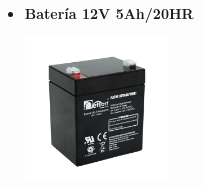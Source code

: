 \documentclass[12pt]{article}
\begin{document}
\begin{itemize}
      \item \textbf{Batería 12V 5Ah/20HR}
            \begin{center}
                  \includegraphics[width=0.3\textwidth]{imagenes/bateria.png}
            \end{center}
\end{itemize}
\end{document}
